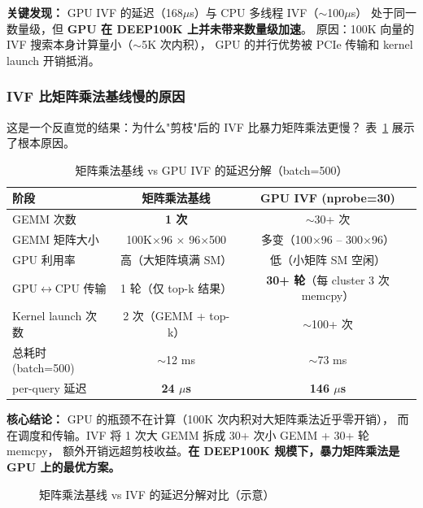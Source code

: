 \documentclass[UTF8,a4paper,10pt]{ctexart}
\begin{document}
\noindent\textbf{关键发现：} GPU IVF 的延迟（168$\mu$s）与 CPU 多线程 IVF（$\sim$100$\mu$s）
处于同一数量级，但 \textbf{GPU 在 DEEP100K 上并未带来数量级加速}。
原因：100K 向量的 IVF 搜索本身计算量小（$\sim$5K 次内积），
GPU 的并行优势被 PCIe 传输和 kernel launch 开销抵消。

\subsubsection{IVF 比矩阵乘法基线慢的原因}

这是一个反直觉的结果：为什么"剪枝"后的 IVF 比暴力矩阵乘法更慢？
表~\ref{tab:ivf-vs-matmul} 展示了根本原因。

\begin{table}[H]
\centering
\caption{矩阵乘法基线 vs GPU IVF 的延迟分解（batch=500）}
\label{tab:ivf-vs-matmul}
\begin{tabular}{p{3cm}cc}
\toprule
阶段 & 矩阵乘法基线 & GPU IVF (nprobe=30) \\
\midrule
GEMM 次数 & \textbf{1 次} & $\sim$30+ 次 \\
GEMM 矩阵大小 & 100K$\times$96 $\times$ 96$\times$500 & 多变（100$\times$96 -- 300$\times$96） \\
GPU 利用率 & 高（大矩阵填满 SM） & 低（小矩阵 SM 空闲） \\
GPU$\leftrightarrow$CPU 传输 & 1 轮（仅 top-k 结果） & \textbf{30+ 轮}（每 cluster 3 次 memcpy） \\
Kernel launch 次数 & 2 次（GEMM + top-k） & $\sim$100+ 次 \\
总耗时 (batch=500) & $\sim$12 ms & $\sim$73 ms \\
per-query 延迟 & \textbf{24 $\mu$s} & \textbf{146 $\mu$s} \\
\bottomrule
\end{tabular}
\end{table}

\textbf{核心结论：} GPU 的瓶颈不在计算（100K 次内积对大矩阵乘法近乎零开销），
而在调度和传输。IVF 将 1 次大 GEMM 拆成 30+ 次小 GEMM + 30+ 轮 memcpy，
额外开销远超剪枝收益。\textbf{在 DEEP100K 规模下，暴力矩阵乘法是 GPU 上的最优方案。}

\begin{figure}[H]
\centering
{}
\caption{矩阵乘法基线 vs IVF 的延迟分解对比（示意）}
\label{fig:ivf-breakdown}
\end{figure}
\end{document}
